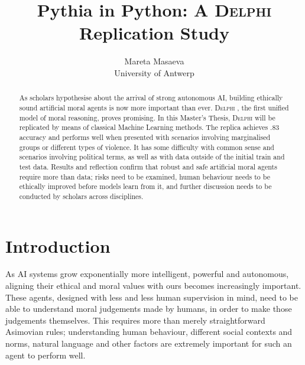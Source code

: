 \documentclass[final]{clv3} %
\title{Pythia in Python: A \textsc{Delphi} Replication Study}
\author{Mareta Masaeva \\ University of Antwerp}
\begin{document}


\newpage



\clearpage



\maketitle %

\begin{abstract}
As scholars hypothesise about the arrival of strong autonomous AI, building ethically sound artificial moral agents is now more important than ever. \textsc{Delphi} \cite{jiang}, the first unified model of moral reasoning, proves promising. In this Master's Thesis, \textsc{Delphi} will be replicated by means of classical Machine Learning methods. The replica achieves .83 accuracy and performs well when presented with scenarios involving marginalised groups or different types of violence. It has some difficulty with common sense and scenarios involving political terms, as well as with data outside of the initial train and test data. Results and reflection confirm that robust and safe artificial moral agents require more than data; risks need to be examined, human behaviour needs to be ethically improved before models learn from it, and further discussion needs to be conducted by scholars across disciplines. 
\end{abstract}

\section{Introduction} \label{sec:intro}
As AI systems grow exponentially more intelligent, powerful and autonomous, aligning their ethical and moral values with ours becomes increasingly important. These agents, designed with less and less human supervision in mind, need to be able to understand moral judgements made by humans, in order to make those judgements themselves. This requires more than merely straightforward Asimovian rules; understanding human behaviour, different social contexts and norms, natural language and other factors are extremely important for such an agent to perform well.\\
\end{document}
